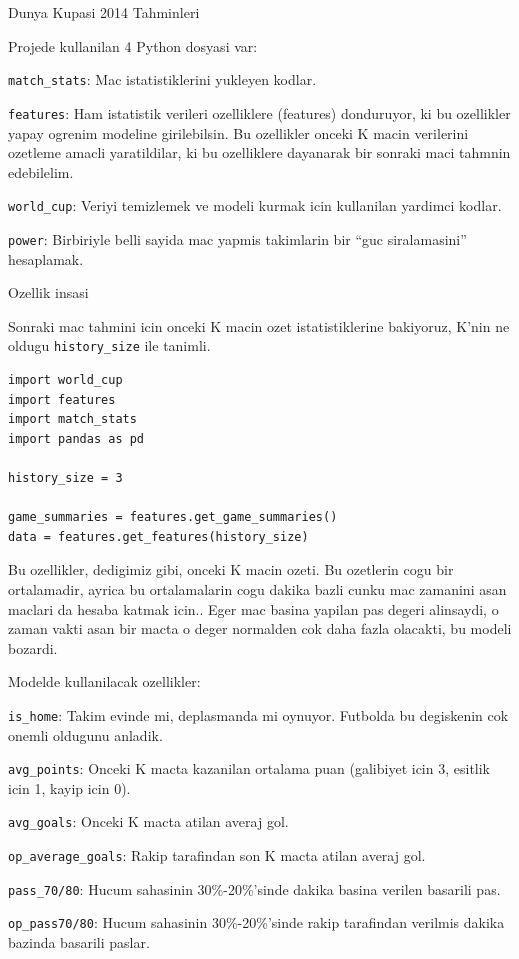 \documentclass[12pt,fleqn]{article}\usepackage{../common}
\begin{document}
Dunya Kupasi 2014 Tahminleri

Projede kullanilan 4 Python dosyasi var: 

\verb!match_stats!: Mac istatistiklerini yukleyen kodlar.

\verb!features!: Ham istatistik verileri ozelliklere (features) donduruyor,
ki bu ozellikler yapay ogrenim modeline girilebilsin. Bu ozellikler onceki
K macin verilerini ozetleme amacli yaratildilar, ki bu ozelliklere
dayanarak bir sonraki maci tahmnin edebilelim.

\verb!world_cup!: Veriyi temizlemek ve modeli kurmak icin kullanilan
yardimci kodlar.

\verb!power!: Birbiriyle belli sayida mac yapmis takimlarin bir ``guc
siralamasini'' hesaplamak. 

Ozellik insasi

Sonraki mac tahmini icin onceki K macin ozet istatistiklerine bakiyoruz, K'nin
ne oldugu \verb!history_size! ile tanimli.

\begin{verbatim}
import world_cup
import features
import match_stats
import pandas as pd

history_size = 3

game_summaries = features.get_game_summaries()
data = features.get_features(history_size)
\end{verbatim}

Bu ozellikler, dedigimiz gibi, onceki K macin ozeti. Bu ozetlerin cogu bir
ortalamadir, ayrica bu ortalamalarin cogu dakika bazli cunku mac zamanini
asan maclari da hesaba katmak icin.. Eger mac basina yapilan pas degeri
alinsaydi, o zaman vakti asan bir macta o deger normalden cok daha fazla
olacakti, bu modeli bozardi.

Modelde kullanilacak ozellikler:

\verb!is_home!: Takim evinde mi, deplasmanda mi oynuyor. Futbolda bu
degiskenin cok onemli oldugunu anladik.

\verb!avg_points!: Onceki K macta kazanilan ortalama puan (galibiyet icin
3, esitlik icin 1, kayip icin 0). 

\verb!avg_goals!: Onceki K macta atilan averaj gol.

\verb!op_average_goals!: Rakip tarafindan son K macta atilan averaj gol.

\verb!pass_70/80!: Hucum sahasinin 30\%-20\%'sinde dakika basina verilen
basarili pas.

\verb!op_pass70/80!: Hucum sahasinin 30\%-20\%'sinde rakip tarafindan
verilmis dakika bazinda basarili paslar.
\end{document}
